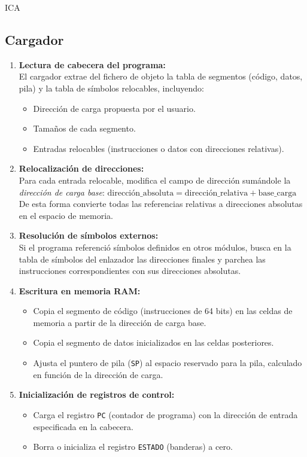 ICA\documentclass{article}
\begin{document}
\subsection{Cargador}

\begin{enumerate}
\item \textbf{Lectura de cabecera del programa:}\\
El cargador extrae del fichero de objeto la tabla de segmentos (código, datos, pila) y la tabla de símbolos relocables, incluyendo:
\begin{itemize}
\item Dirección de carga propuesta por el usuario.
\item Tamaños de cada segmento.
\item Entradas relocables (instrucciones o datos con direcciones relativas).
\end{itemize}

\item \textbf{Relocalización de direcciones:}\\
Para cada entrada relocable, modifica el campo de dirección sumándole la \emph{dirección de carga base}:
$       \text{dirección\_absoluta} = \text{dirección\_relativa} + \text{base\_carga}
    $
De esta forma convierte todas las referencias relativas a direcciones absolutas en el espacio de memoria.

\item \textbf{Resolución de símbolos externos:}\\
Si el programa referenció símbolos definidos en otros módulos, busca en la tabla de símbolos del enlazador las direcciones finales y parchea las instrucciones correspondientes con sus direcciones absolutas.

\item \textbf{Escritura en memoria RAM:}\\
\begin{itemize}
\item Copia el segmento de código (instrucciones de 64 bits) en las celdas de memoria a partir de la dirección de carga base.
\item Copia el segmento de datos inicializados en las celdas posteriores.
\item Ajusta el puntero de pila (\texttt{SP}) al espacio reservado para la pila, calculado en función de la dirección de carga.
\end{itemize}

\item \textbf{Inicialización de registros de control:}\\
\begin{itemize}
\item Carga el registro \texttt{PC} (contador de programa) con la dirección de entrada especificada en la cabecera.
\item Borra o inicializa el registro \texttt{ESTADO} (banderas) a cero.
\end{itemize}


\end{enumerate}
\end{document}
